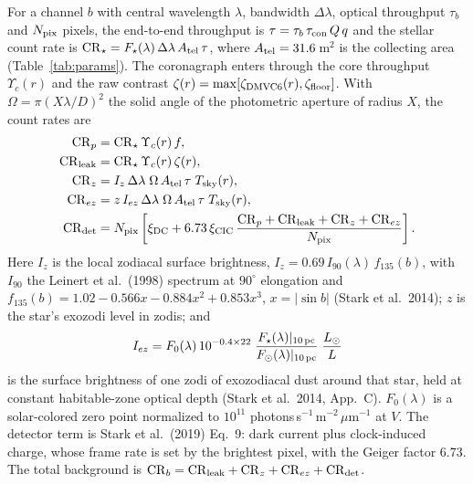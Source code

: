 \documentclass[11pt,a4paper]{article}
\begin{document}
For a channel $b$ with central wavelength $\lambda$, bandwidth $\Delta\lambda$, optical throughput
$\tau_b$ and $N_{\rm pix}$ pixels, the end-to-end throughput is
$\tau = \tau_b\,\tau_{\rm con}\,Q\,q$ and the stellar count rate is
$\mathrm{CR}_\star = F_\star(\lambda)\,\Delta\lambda\,A_{\rm tel}\,\tau$, where
$A_{\rm tel} = 31.6$\,m$^2$ is the collecting area (Table~\ref{tab:params}). The coronagraph
enters through the core throughput $\Upsilon_c(r)$ and the raw contrast
$\zeta(r) = \max[\zeta_{\rm DMVC6}(r), \zeta_{\rm floor}]$. With
$\Omega = \pi(X\lambda/D)^2$ the solid angle of the photometric aperture of radius $X$, the
count rates are
\begin{align}
\mathrm{CR}_p &= \mathrm{CR}_\star\,\Upsilon_c(r)\,f, \label{eq:crp}\\
\mathrm{CR}_{\rm leak} &= \mathrm{CR}_\star\,\Upsilon_c(r)\,\zeta(r), \label{eq:crleak}\\
\mathrm{CR}_z &= I_z\,\Delta\lambda\;\Omega\,A_{\rm tel}\,\tau\;T_{\rm sky}(r), \label{eq:crz}\\
\mathrm{CR}_{ez} &= z\,I_{ez}\,\Delta\lambda\;\Omega\,A_{\rm tel}\,\tau\;T_{\rm sky}(r),
\label{eq:crez}\\
\mathrm{CR}_{\rm det} &= N_{\rm pix}\left[\xi_{\rm DC} + 6.73\,\xi_{\rm CIC}\,
\frac{\mathrm{CR}_p + \mathrm{CR}_{\rm leak} + \mathrm{CR}_z + \mathrm{CR}_{ez}}{N_{\rm pix}}
\right]. \label{eq:crdet}
\end{align}
Here $I_z$ is the local zodiacal surface brightness,
$I_z = 0.69\,I_{90}(\lambda)\,f_{135}(b)$, with $I_{90}$ the Leinert et al.\ (1998) spectrum at
$90^\circ$ elongation and $f_{135}(b) = 1.02 - 0.566x - 0.884x^2 + 0.853x^3$, $x = |\sin b|$
(Stark et al.\ 2014); $z$ is the star's exozodi level in zodis; and
\begin{equation}
I_{ez} = F_0(\lambda)\,10^{-0.4\times 22}\;
\frac{F_\star(\lambda)|_{10\,{\rm pc}}}{F_\odot(\lambda)|_{10\,{\rm pc}}}\;\frac{L_\odot}{L}
\label{eq:iez}
\end{equation}
is the surface brightness of one zodi of exozodiacal dust around that star, held at constant
habitable-zone optical depth (Stark et al.\ 2014, App.~C). $F_0(\lambda)$ is a solar-colored
zero point normalized to $10^{11}$ photons\,s$^{-1}$\,m$^{-2}$\,$\mu$m$^{-1}$ at $V$. The
detector term is Stark et al.\ (2019) Eq.~9: dark current plus clock-induced charge, whose frame
rate is set by the brightest pixel, with the Geiger factor 6.73. The total background is
$\mathrm{CR}_b = \mathrm{CR}_{\rm leak} + \mathrm{CR}_z + \mathrm{CR}_{ez} + \mathrm{CR}_{\rm det}$.
\end{document}

